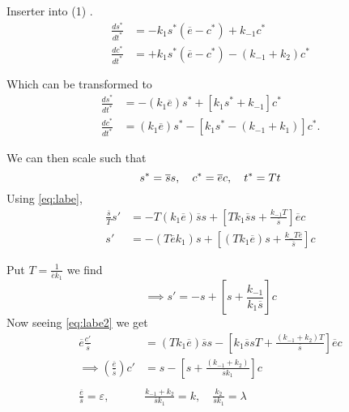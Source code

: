 \documentclass{article}
\theoremstyle{remark}
\begin{document}
\begin{enumerate}[label=(\roman*)]
Inserter into (1) . \[
\begin{split}
  \frac{d s ^{*}}{d t ^{*}}  &=  -k_{1} s ^{*} \left( \overline{e}  -  c ^{*} \right) + k_{-1} c ^{*} \\
  \frac{d c ^{*}}{d t ^{*}}  &=  + k_{1} s ^{*}  \left( \overline{e}  -  c ^{*} \right)  -  \left( k_{-1} + k_{2} \right) c^{*} \\
  & \\ 
\end{split} 
\] 
Which can be transformed to 
\begin{align}
  \label{eq:labe}
  \frac{d s ^{*}}{d t^{*}}  &=  - \left( k_{1} \overline{e}  \right) s ^{*} +  \left[ k_{1} s ^{*} + k_{-1} \right] c ^{*} \\
  \label{eq:labe2}
  \frac{d c ^{*}}{d t^{*}}   & = \left( k_{1} \overline{e}  \right) s ^{*} -  \left[ k_{1} s ^{*} - \left( k_{-1} + k_{1}   \right) \right] c ^{*} 
.\end{align}

We can then scale such that \[
s ^{*} = \overline{s}  s, \quad  c ^{*} = \overline{e}  c , \quad  t ^{*} =  Tt    \\
\] 
Using \eqref{eq:labe}, \[
  \begin{split}
    \frac{\overline{s}  }{ T}  s'  &=  -T \left( k_{1} \overline{e}  \right) \overline{s}  s + \left[ Tk_{1} \overline{s} s + \frac{k_{-1} T}{ \overline{s} }  \right] \overline{e}  c \\
s'   & = - \left( T \overline{e} k_{1} \right)s + \left[ \left( Tk_{1} \overline{e}  \right)s + \frac{k_{-} T \overline{e}  }{ \overline{s} }  \right]c
  \end{split} 
\]  

Put $T = \frac{1}{\overline{e}  k_{1}}$ we find \[
\implies  s'  = - s + \left[ s + \frac{k_{-1}}{ k_{1} \overline{s} }  \right] c
\] 
Now seeing \eqref{eq:labe2} we get \[
\begin{split}
  \overline{e} \frac{c' }{ \overline{s} }  &=  \left( T k_{1} \overline{e}  \right) \overline{s}  s - \left[ k_{1} \overline{s}  s T + \frac{\left( k_{-1} + k_{2} \right) T}{ \overline{s}}  \right] \overline{e}  c \\
  \implies  \left( \frac{\overline{e} }{ \overline{s} }\right)  c' &= s - \left[ s + \frac{\left( k_{-1} + k_{2} \right)}{ \overline{s}  k_{1}}  \right] c \\     \\ 
  \frac{\overline{e} }{\overline{s} }  = \varepsilon  , \quad   &  \frac{k_{-1} + k_{2}}{ \overline{s}  k_{1}}  = k , \quad  \frac{k_{2}}{ \overline{s}  k_{1}}  = \lambda \\
\end{split} 
\]  


\end{enumerate}
\end{document}
